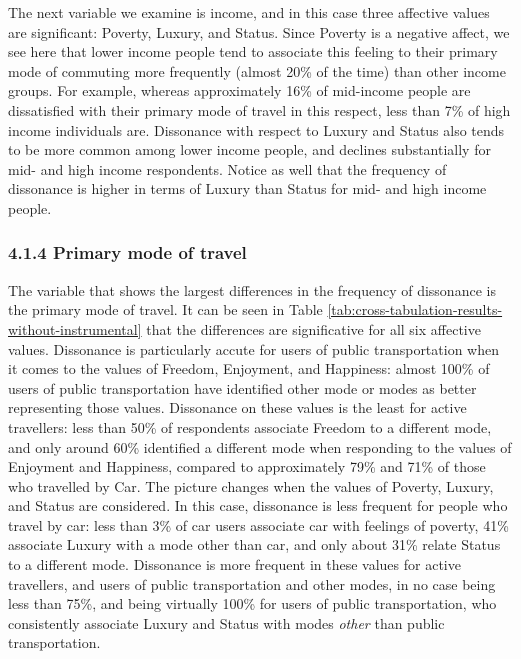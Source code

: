 \documentclass[]{elsarticle} %
\begin{document}
The next variable we examine is income, and in this case three affective
values are significant: Poverty, Luxury, and Status. Since Poverty is a
negative affect, we see here that lower income people tend to associate
this feeling to their primary mode of commuting more frequently (almost
20\% of the time) than other income groups. For example, whereas
approximately 16\% of mid-income people are dissatisfied with their
primary mode of travel in this respect, less than 7\% of high income
individuals are. Dissonance with respect to Luxury and Status also tends
to be more common among lower income people, and declines substantially
for mid- and high income respondents. Notice as well that the frequency
of dissonance is higher in terms of Luxury than Status for mid- and high
income people.

\hypertarget{primary-mode-of-travel}{%
\subsubsection{4.1.4 Primary mode of
travel}\label{primary-mode-of-travel}}

The variable that shows the largest differences in the frequency of
dissonance is the primary mode of travel. It can be seen in Table
\ref{tab:cross-tabulation-results-without-instrumental} that the
differences are significative for all six affective values. Dissonance
is particularly accute for users of public transportation when it comes
to the values of Freedom, Enjoyment, and Happiness: almost 100\% of
users of public transportation have identified other mode or modes as
better representing those values. Dissonance on these values is the
least for active travellers: less than 50\% of respondents associate
Freedom to a different mode, and only around 60\% identified a different
mode when responding to the values of Enjoyment and Happiness, compared
to approximately 79\% and 71\% of those who travelled by Car. The
picture changes when the values of Poverty, Luxury, and Status are
considered. In this case, dissonance is less frequent for people who
travel by car: less than 3\% of car users associate car with feelings of
poverty, 41\% associate Luxury with a mode other than car, and only
about 31\% relate Status to a different mode. Dissonance is more
frequent in these values for active travellers, and users of public
transportation and other modes, in no case being less than 75\%, and
being virtually 100\% for users of public transportation, who
consistently associate Luxury and Status with modes \emph{other} than
public transportation.
\end{document}
